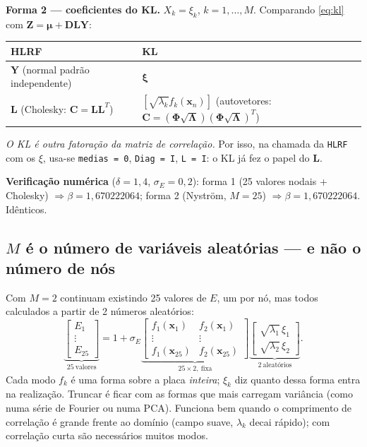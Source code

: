 \documentclass[11pt,a4paper]{article}
\newcommand{\bx}{\bm{x}}
\newcommand{\bxi}{\bm{\xi}}
\begin{document}
\textbf{Forma 2 --- coeficientes do KL.} $X_k=\xi_k$, $k=1,\dots,M$. Comparando \eqref{eq:kl} com $\bm{Z}=\bm{\mu}+\bm{D}\bm{L}\bm{Y}$:
\begin{center}
\begin{tabular}{ll}
\toprule
HLRF & KL\\
\midrule
$\bm{Y}$ (normal padrão independente) & $\bxi$\\
$\bm{L}$ (Cholesky: $\bm{C}=\bm{L}\bm{L}^T$) & $[\sqrt{\lambda_k}f_k(\bx_n)]$ (autovetores: $\bm{C}=(\bm\Phi\sqrt{\bm\Lambda})(\bm\Phi\sqrt{\bm\Lambda})^T$)\\
\bottomrule
\end{tabular}
\end{center}
\emph{O KL é outra fatoração da matriz de correlação.} Por isso, na chamada da \texttt{HLRF} com os $\xi$, usa-se \texttt{medias = 0}, \texttt{Diag = I}, \texttt{L = I}: o KL já fez o papel do $\bm{L}$.

\textbf{Verificação numérica} ($\delta=1{,}4$, $\sigma_E=0{,}2$): forma 1 (25 valores nodais + Cholesky) $\Rightarrow\beta=1{,}670222064$; forma 2 (Nyström, $M=25$) $\Rightarrow\beta=1{,}670222064$. Idênticos.

\subsection{$M$ é o número de variáveis aleatórias --- e não o número de nós}
Com $M=2$ continuam existindo 25 valores de $E$, um por nó, mas todos calculados a partir de 2 números aleatórios:
\[
\underbrace{\begin{bmatrix}E_1\\ \vdots\\ E_{25}\end{bmatrix}}_{25\ \text{valores}}
=1+\sigma_E
\underbrace{\begin{bmatrix}f_1(\bx_1)&f_2(\bx_1)\\ \vdots&\vdots\\ f_1(\bx_{25})&f_2(\bx_{25})\end{bmatrix}}_{25\times2,\ \text{fixa}}
\underbrace{\begin{bmatrix}\sqrt{\lambda_1}\,\xi_1\\ \sqrt{\lambda_2}\,\xi_2\end{bmatrix}}_{2\ \text{aleatórios}} .
\]
Cada modo $f_k$ é uma forma sobre a placa \emph{inteira}; $\xi_k$ diz quanto dessa forma entra na realização. Truncar é ficar com as formas que mais carregam variância (como numa série de Fourier ou numa PCA). Funciona bem quando o comprimento de correlação é grande frente ao domínio (campo suave, $\lambda_k$ decai rápido); com correlação curta são necessários muitos modos.
\end{document}
